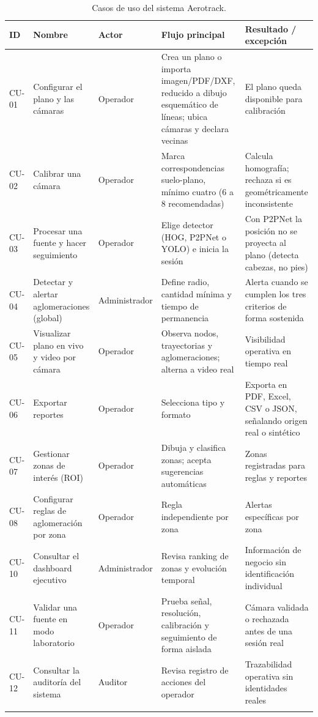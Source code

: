 \begin{longtable}{@{}L{1.6cm}L{3.4cm}L{2.2cm}L{4.3cm}L{4.3cm}@{}}
\toprule
\textbf{ID} & \textbf{Nombre} & \textbf{Actor} & \textbf{Flujo principal} & \textbf{Resultado / excepción} \\
\midrule
\endhead
CU-01 & Configurar el plano y las cámaras & Operador &
  Crea un plano o importa imagen/PDF/DXF, reducido a dibujo esquemático de líneas; ubica
  cámaras y declara vecinas &
  El plano queda disponible para calibración \\
CU-02 & Calibrar una cámara & Operador &
  Marca correspondencias suelo-plano, mínimo cuatro (6 a 8 recomendadas) &
  Calcula homografía; rechaza si es geométricamente inconsistente \\
CU-03 & Procesar una fuente y hacer seguimiento & Operador &
  Elige detector (HOG, P2PNet o YOLO) e inicia la sesión &
  Con P2PNet la posición no se proyecta al plano (detecta cabezas, no pies) \\
CU-04 & Detectar y alertar aglomeraciones (global) & Administrador &
  Define radio, cantidad mínima y tiempo de permanencia &
  Alerta cuando se cumplen los tres criterios de forma sostenida \\
CU-05 & Visualizar plano en vivo y video por cámara & Operador &
  Observa nodos, trayectorias y aglomeraciones; alterna a video real &
  Visibilidad operativa en tiempo real \\
CU-06 & Exportar reportes & Operador &
  Selecciona tipo y formato &
  Exporta en PDF, Excel, CSV o JSON, señalando origen real o sintético \\
CU-07 & Gestionar zonas de interés (ROI) & Operador &
  Dibuja y clasifica zonas; acepta sugerencias automáticas &
  Zonas registradas para reglas y reportes \\
CU-08 & Configurar reglas de aglomeración por zona & Operador &
  Regla independiente por zona &
  Alertas específicas por zona \\
CU-10 & Consultar el dashboard ejecutivo & Administrador &
  Revisa ranking de zonas y evolución temporal &
  Información de negocio sin identificación individual \\
CU-11 & Validar una fuente en modo laboratorio & Operador &
  Prueba señal, resolución, calibración y seguimiento de forma aislada &
  Cámara validada o rechazada antes de una sesión real \\
CU-12 & Consultar la auditoría del sistema & Auditor &
  Revisa registro de acciones del operador &
  Trazabilidad operativa sin identidades reales \\
\bottomrule
\caption{Casos de uso del sistema Aerotrack.}
\label{tab:casos-uso}
\end{longtable}

